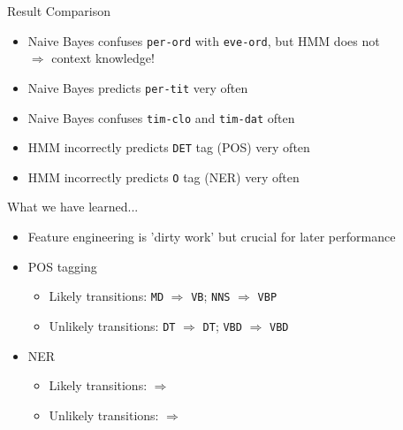 \begin{frame}{Result Comparison}{}
	\begin{itemize}
		\item Naive Bayes confuses \texttt{per-ord} with \texttt{eve-ord}, but HMM does not \\
			$\Rightarrow$ context knowledge!
		\item Naive Bayes predicts \texttt{per-tit} very often
		\item Naive Bayes confuses \texttt{tim-clo} and \texttt{tim-dat} often
		\item HMM incorrectly predicts \texttt{DET} tag (POS) very often
		\item HMM incorrectly predicts \texttt{O} tag (NER) very often
	\end{itemize}
\end{frame}


\begin{frame}{What we have learned...}{}
	\begin{itemize}
		\item Feature engineering is 'dirty work' but crucial for later performance
		\item POS tagging
		\begin{itemize}
			\item Likely transitions: \texttt{MD} $\Rightarrow$ \texttt{VB}; \texttt{NNS} $\Rightarrow$ \texttt{VBP}
			\item Unlikely transitions: \texttt{DT} $\Rightarrow$ \texttt{DT}; \texttt{VBD} $\Rightarrow$ \texttt{VBD}
		\end{itemize}
		\item NER
		\begin{itemize}
			\item Likely transitions: \texttt{} $\Rightarrow$ \texttt{}
			\item Unlikely transitions: \texttt{} $\Rightarrow$ \texttt{}
		\end{itemize}
	\end{itemize}
\end{frame}


\makethanks


